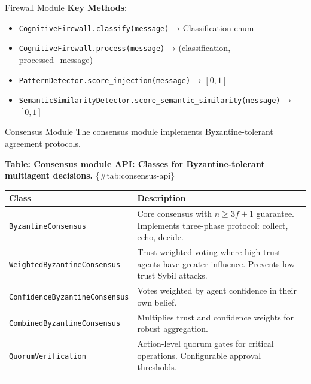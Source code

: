 \documentclass[
  ignorenonframetext,
]{beamer}
\newcounter{none} %
\providecommand{\tightlist}{%
  \setlength{\itemsep}{0pt}\setlength{\parskip}{0pt}}
\begin{document}
\begin{frame}[fragile]{Firewall Module}
\textbf{Key Methods}:

\begin{itemize}
\tightlist
\item
  \texttt{CognitiveFirewall.classify(message)} → Classification enum
\item
  \texttt{CognitiveFirewall.process(message)} → (classification,
  processed\_message)
\item
  \texttt{PatternDetector.score\_injection(message)} → \([0, 1]\)
\item
  \texttt{SemanticSimilarityDetector.score\_semantic\_similarity(message)}
  → \([0, 1]\)
\end{itemize}
\end{frame}

\begin{frame}[fragile]{Consensus Module}
\protect{}\label{sec:consensus-api}
The consensus module implements Byzantine-tolerant agreement protocols.

\textbf{Table: Consensus module API: Classes for Byzantine-tolerant
multiagent decisions.} \{\#tab:consensus-api\}

{\def\LTcaptype{none} %
\begin{longtable}[]{@{}
  >{\raggedright\arraybackslash}p{}
  >{\raggedright\arraybackslash}p{}@{}}
\toprule\noalign{}
\begin{minipage}[b]{\linewidth}\raggedright
Class
\end{minipage} & \begin{minipage}[b]{\linewidth}\raggedright
Description
\end{minipage} \\
\midrule\noalign{}
\endhead
\texttt{ByzantineConsensus} & Core consensus with \(n \geq 3f + 1\)
guarantee. Implements three-phase protocol: collect, echo, decide. \\
\texttt{WeightedByzantineConsensus} & Trust-weighted voting where
high-trust agents have greater influence. Prevents low-trust Sybil
attacks. \\
\texttt{ConfidenceByzantineConsensus} & Votes weighted by agent
confidence in their own belief. \\
\texttt{CombinedByzantineConsensus} & Multiplies trust and confidence
weights for robust aggregation. \\
\texttt{QuorumVerification} & Action-level quorum gates for critical
operations. Configurable approval thresholds. \\
\bottomrule\noalign{}
\end{longtable}
}


\end{frame}
\end{document}
